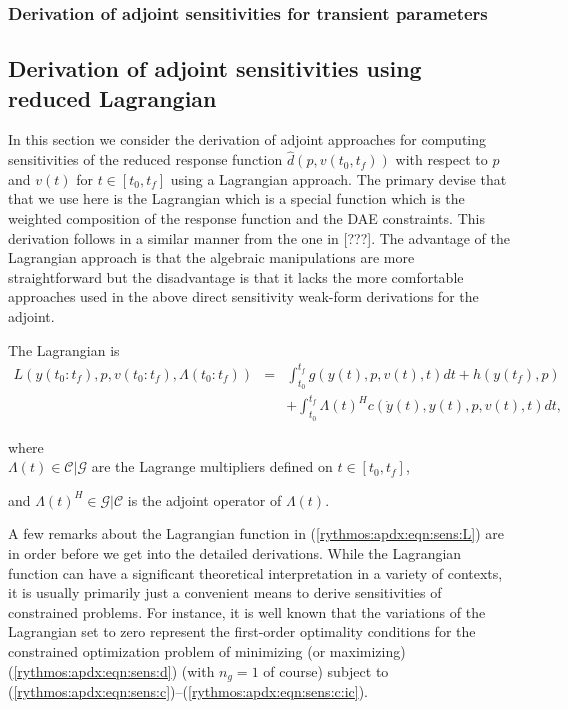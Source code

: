 \documentclass[pdf,ps2pdf,11pt]{SANDreport}
\begin{document}
\subsubsection{Derivation of adjoint sensitivities for transient parameters}

\subsection{Derivation of adjoint sensitivities using reduced Lagrangian}

In this section we consider the derivation of adjoint approaches for computing
sensitivities of the reduced response function $\hat{d}(p,v(t_0,t_f))$ with
respect to $p$ and $v(t)$ for $t\in[t_0,t_f]$ using a Lagrangian approach.  The
primary devise that that we use here is the Lagrangian which is a special
function which is the weighted composition of the response function and the
DAE constraints.  This derivation follows in a similar manner from the one in
[???].  The advantage of the Lagrangian approach is that the algebraic
manipulations are more straightforward but the disadvantage is that it lacks
the more comfortable approaches used in the above direct sensitivity weak-form
derivations for the adjoint.

The Lagrangian is
%
\begin{eqnarray}
L(y(t_0:t_f),p,v(t_0:t_f),\Lambda(t_0:t_f))
& = & \int_{t_0}^{t_f} g(y(t),p,v(t),t) dt + h(y(t_f),p) \nonumber \\
& & + \int_{t_0}^{t_f} \Lambda(t)^H c(\dot{y}(t),y(t),p,v(t),t) dt,
\label{rythmos:apdx:eqn:sens:L}
\end{eqnarray}
\begin{tabbing}
\hspace{4ex}where\hspace{1ex}\= \\
\>	$\Lambda(t) \in \mathcal{C}|\mathcal{G}$ are the Lagrange multipliers defined on $t\in[t_0,t_f]$,
\end{tabbing}
%
and $\Lambda(t)^H\in\mathcal{G}|\mathcal{C}$ is the adjoint operator
of $\Lambda(t)$.

A few remarks about the Lagrangian function in (\ref{rythmos:apdx:eqn:sens:L})
are in order before we get into the detailed derivations.  While the
Lagrangian function can have a significant theoretical interpretation in a
variety of contexts, it is usually primarily just a convenient means to derive
sensitivities of constrained problems.  For instance, it is well known that
the variations of the Lagrangian set to zero represent the first-order
optimality conditions for the constrained optimization problem of minimizing
(or maximizing) (\ref{rythmos:apdx:eqn:sens:d}) (with $n_g=1$ of course)
subject to
(\ref{rythmos:apdx:eqn:sens:c})--(\ref{rythmos:apdx:eqn:sens:c:ic}).
\end{document}
